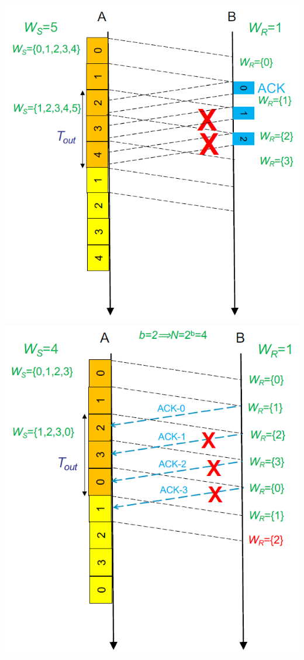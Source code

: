 \documentclass[12pt]{article}
\begin{document}
\begin{center}
    \includegraphics[scale=0.3]{go_back_n_ack_error}
    \includegraphics[scale=0.3]{go_back_n_equivocation}
\end{center}
\end{document}
